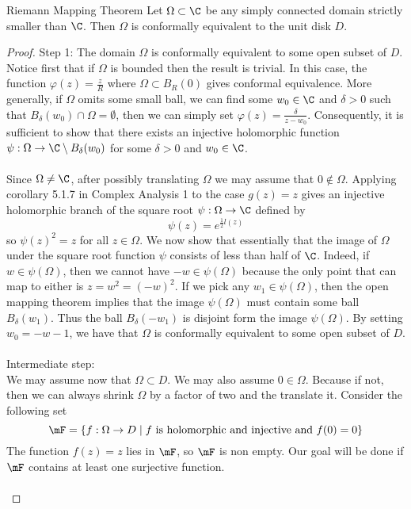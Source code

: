 \documentclass[a4paper]{article}
\begin{document}
\begin{thm}{Riemann Mapping Theorem}{} Let $\Omega\subset\C$ be any simply connected domain strictly smaller than $\C$. Then $\Omega$ is conformally equivalent to the unit disk $D$. \tcbline
\begin{proof}
Step 1: The domain $\Omega$ is conformally equivalent to some open subset of $D$. \\
Notice first that if $\Omega$ is bounded then the result is trivial. In this case, the function $\varphi(z)=\frac{z}{R}$ where $\Omega\subset B_R(0)$ gives conformal equivalence. More generally, if $\Omega$ omits some small ball, we can find some $w_0\in\C$ and $\delta>0$ such that $B_\delta(w_0)\cap\Omega=\emptyset$, then we can simply set $\varphi(z)=\frac{\delta}{z-w_0}$. Consequently, it is sufficient to show that there exists an injective holomorphic function $\psi:\Omega\to\C\setminus B_\delta(w_0)$ for some $\delta>0$ and $w_0\in\C$. \\~\\

Since $\Omega\neq\C$, after possibly translating $\Omega$ we may assume that $0\notin\Omega$. Applying corollary 5.1.7 in Complex Analysis 1 to the case $g(z)=z$ gives an injective holomorphic branch of the square root $\psi:\Omega\to\C$ defined by $$\psi(z)=e^{\frac{1}{2}l(z)}$$ so $\psi(z)^2=z$ for all $z\in\Omega$. We now show that essentially that the image of $\Omega$ under the square root function $\psi$ consists of less than half of $\C$. Indeed, if $w\in\psi(\Omega)$, then we cannot have $-w\in\psi(\Omega)$ because the only point that can map to either is $z=w^2=(-w)^2$. If we pick any $w_1\in\psi(\Omega)$, then the open mapping theorem implies that the image $\psi(\Omega)$ must contain some ball $B_\delta(w_1)$. Thus the ball $B_\delta(-w_1)$ is disjoint form the image $\psi(\Omega)$. By setting $w_0=-w-1$, we have that $\Omega$ is conformally equivalent to some open subset of $D$. \\~\\

Intermediate step: \\
We may assume now that $\Omega\subset D$. We may also assume $0\in\Omega$. Because if not, then we can always shrink $\Omega$ by a factor of two and the translate it. Consider the following set $$\mF=\{f:\Omega\to D\;|\;f\text{ is holomorphic and injective and }f(0)=0\}$$ The function $f(z)=z$ lies in $\mF$, so $\mF$ is non empty. Our goal will be done if $\mF$ contains at least one surjective function. \\~\\


\end{proof}
\end{thm}
\end{document}
